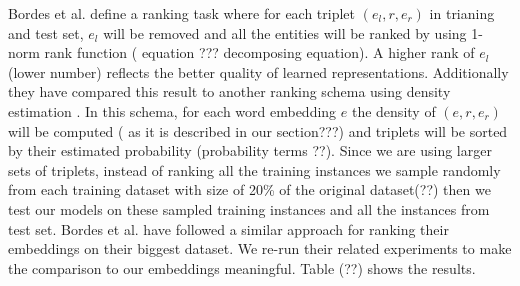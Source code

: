 \documentclass[11pt]{article}
\begin{document}
Bordes et al. define a ranking task where for each triplet $(e_{l} , r, e_{r} ) $ in trianing and test set,
     $e_{l}$ will be removed and all the entities will be ranked by 
     using 1-norm rank function  ( equation ??? decomposing equation). A higher rank of $e_{l}$ (lower number)
     reflects the better quality of learned representations. Additionally they have compared this result to
     another ranking schema using density estimation . 
     In this schema, for each word embedding $e$ the density of $(e , r, e_{r} )$ will be computed
     ( as it is described in our section???) and triplets will be sorted by their estimated probability 
     (probability terms ??). Since we are using larger sets of triplets, instead of ranking
     all the training instances
     we sample randomly from each training dataset with size of 20\% of the original dataset(??) then
     we test our models on these sampled training instances and all the instances from test set. Bordes et al. have followed
     a similar  approach for ranking their embeddings on their biggest dataset. We re-run  their related experiments to make 
     the comparison to our embeddings meaningful. Table (??) shows the results.
\FloatBarrier
\end{document}
